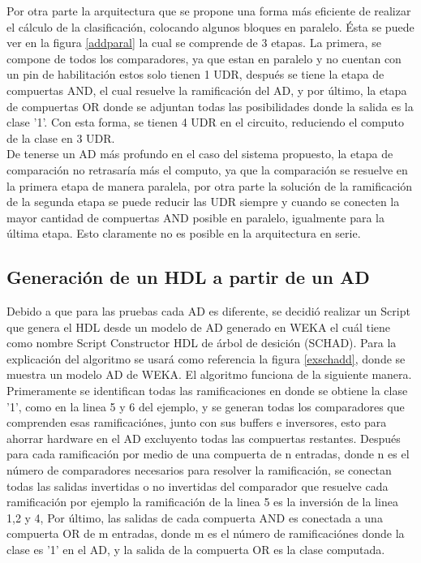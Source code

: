 \documentclass[twoside,spanish,ESP,MSc]{plantillaLabUPV}
\theoremstyle{definition}
\begin{document}
Por otra parte la arquitectura que se propone una forma más eficiente de realizar el cálculo de la clasificación, colocando algunos bloques en paralelo. Ésta se puede ver en la figura \ref{addparal} la cual se comprende de 3 etapas. La primera, se compone de todos los comparadores, ya que estan en paralelo y no cuentan con un pin de habilitación estos solo tienen 1 UDR, después se tiene la etapa de compuertas AND, el cual resuelve la ramificación del AD, y por último, la etapa de compuertas OR donde se adjuntan todas las posibilidades donde la salida es la clase '1'. Con esta forma, se tienen 4 UDR en el circuito, reduciendo el computo de la clase en 3 UDR.\\

De tenerse un AD más profundo en el caso del sistema propuesto, la etapa de comparación no retrasaría más el computo, ya que la comparación se resuelve en la primera etapa de manera paralela, por otra parte la solución de la ramificación de la segunda etapa se puede reducir las UDR siempre y cuando se conecten la mayor cantidad de compuertas AND posible en paralelo, igualmente para la última etapa. Esto claramente no es posible en la arquitectura en serie.


\subsection{Generación de un HDL a partir de un AD}
Debido a que para las pruebas cada AD es diferente, se decidió realizar un Script que genera el HDL desde un modelo de AD generado en WEKA el cuál tiene como nombre Script Constructor HDL de árbol de desición (SCHAD). Para la explicación del algoritmo se usará como referencia la figura \ref{exschadd}, donde se muestra un modelo AD de WEKA. El algoritmo funciona de la siguiente manera. Primeramente se identifican todas las ramificaciones en donde se obtiene la clase '1', como en la linea 5 y 6 del ejemplo, y se generan todas los comparadores que comprenden esas ramificaciónes, junto con sus buffers e inversores, esto para ahorrar hardware en el AD excluyento todas las compuertas restantes. Después para cada ramificación por medio de una compuerta de n entradas, donde n es el número de comparadores necesarios para resolver la ramificación, se conectan todas las salidas invertidas o no invertidas del comparador que resuelve cada ramificación por ejemplo la ramificación de la linea 5 es la inversión de la linea 1,2 y 4, Por último, las salidas de cada compuerta AND es conectada a una compuerta OR de m entradas, donde m es el número de ramificaciónes donde la clase es '1' en el AD, y la salida de la compuerta OR es la clase computada.
 
\end{document}
